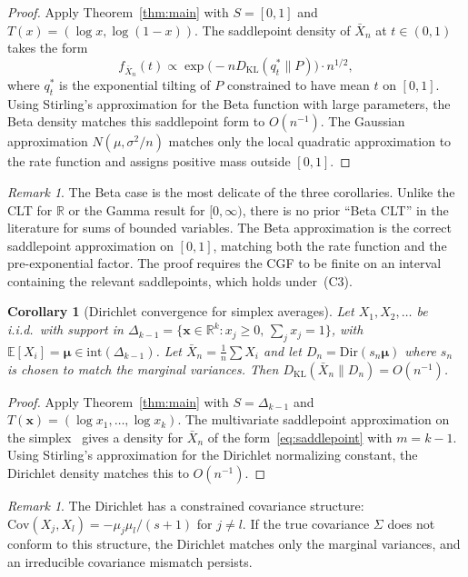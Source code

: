 \documentclass[aps,pre,twocolumn,superscriptaddress,nofootinbib]{revtex4-2}
\newtheorem{corollary}[theorem]{Corollary}
\theoremstyle{definition}
\theoremstyle{remark}
\newtheorem{remark}[theorem]{Remark}
\newcommand{\R}{\mathbb{R}}
\newcommand{\E}{\mathbb{E}}
\newcommand{\Cov}{\mathrm{Cov}}
\newcommand{\KL}{D_{\mathrm{KL}}}
\newcommand{\inte}{\mathrm{int}}
\begin{document}
\begin{proof}
Apply Theorem~\ref{thm:main} with $S=[0,1]$ and $T(x)=(\log x,\log(1{-}x))$.
The saddlepoint density of $\bar{X}_n$ at $t\in(0,1)$ takes the form
\begin{equation}
f_{\bar{X}_n}(t)\propto\exp\!\big({-}nD_{\mathrm{KL}}(q^*_t\|P)\big)
\cdot n^{1/2},
\end{equation}
where $q^*_t$ is the exponential tilting of $P$ constrained to have mean $t$
on $[0,1]$.  Using Stirling's approximation for the Beta function with
large parameters, the Beta density matches this saddlepoint form to
$O(n^{-1})$.  The Gaussian approximation $N(\mu,\sigma^2/n)$ matches only the
local quadratic approximation to the rate function and assigns positive mass
outside $[0,1]$.
\end{proof}

\begin{remark}
The Beta case is the most delicate of the three corollaries.
Unlike the CLT for $\R$ or the Gamma result for $[0,\infty)$, there is no
prior ``Beta CLT'' in the literature for sums of bounded variables.  The Beta
approximation is the correct saddlepoint approximation on $[0,1]$, matching
both the rate function and the pre-exponential factor.
The proof requires the CGF to be finite on an interval containing the relevant
saddlepoints, which holds under~(C3).
\end{remark}

\begin{corollary}[Dirichlet convergence for simplex averages]\label{cor:dirichlet}
Let $X_1,X_2,\ldots$ be i.i.d.\ with support in $\Delta_{k-1}=\{\bm{x}\in\R^k:
x_j\ge 0,\,\sum_j x_j=1\}$, with $\E[X_i]=\bm{\mu}\in\inte(\Delta_{k-1})$.
Let $\bar{X}_n=\frac{1}{n}\sum X_i$ and let $D_n=\mathrm{Dir}(s_n\bm{\mu})$
where $s_n$ is chosen to match the marginal variances.
Then $\KL(\bar{X}_n\|D_n)=O(n^{-1})$.
\end{corollary}

\begin{proof}
Apply Theorem~\ref{thm:main} with $S=\Delta_{k-1}$ and
$T(\bm{x})=(\log x_1,\ldots,\log x_k)$.  The multivariate saddlepoint
approximation on the simplex~\cite{BarndorffNielsen1979} gives a density for
$\bar{X}_n$ of the form~\eqref{eq:saddlepoint} with $m=k{-}1$.  Using
Stirling's approximation for the Dirichlet normalizing constant, the Dirichlet
density matches this to $O(n^{-1})$.
\end{proof}

\begin{remark}
The Dirichlet has a constrained covariance structure:
$\Cov(X_j,X_l)=-\mu_j\mu_l/(s{+}1)$ for $j\neq l$.
If the true covariance $\Sigma$ does not conform to this structure, the
Dirichlet matches only the marginal variances, and an irreducible covariance
mismatch persists.
\end{remark}
\end{document}
